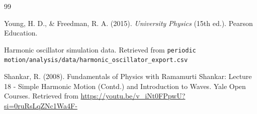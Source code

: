 \documentclass[12pt]{article}
\begin{document}
\begin{thebibliography}{99}

     Young, H. D., \& Freedman, R. A. (2015). \textit{University Physics} (15th ed.). Pearson Education.

     Harmonic oscillator simulation data. Retrieved from \texttt{periodic motion/analysis/data/harmonic\_oscillator\_export.csv}

     Shankar, R. (2008). Fundamentals of Physics with Ramamurti Shankar: Lecture 18 - Simple Harmonic Motion (Contd.) and Introduction to Waves. Yale Open Courses. Retrieved from \url{https://youtu.be/v_iNt0FPpwU?si=0ruRsLqZNc1Wa4F-}

\end{thebibliography}
\end{document}
